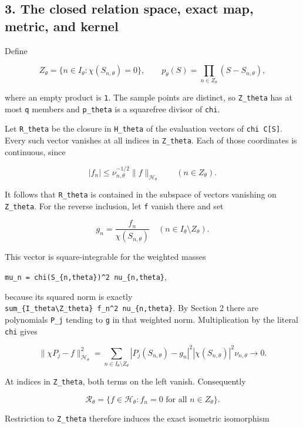\subsection{3. The closed relation space, exact map, metric, and kernel}\label{the-closed-relation-space-exact-map-metric-and-kernel}

Define

\[
Z_\theta=\{n\in I_\theta:\chi(S_{n,\theta})=0\},\qquad
p_\theta(S)=\prod_{n\in Z_\theta}(S-S_{n,\theta}),
\tag{CQ14}
\]

where an empty product is \texttt{1}. The sample points are distinct, so \texttt{Z\_theta} has at most \texttt{q} members and \texttt{p\_theta} is a squarefree divisor of \texttt{chi}.

Let \texttt{R\_theta} be the closure in \texttt{H\_theta} of the evaluation vectors of \texttt{chi\ C{[}S{]}}. Every such vector vanishes at all indices in \texttt{Z\_theta}. Each of those coordinates is continuous, since

\[
|f_n|\le\nu_{n,\theta}^{-1/2}\|f\|_{\mathcal H_\theta}
\qquad(n\in Z_\theta).
\tag{CQ15}
\]

It follows that \texttt{R\_theta} is contained in the subspace of vectors vanishing on \texttt{Z\_theta}. For the reverse inclusion, let \texttt{f} vanish there and set

\[
g_n=\frac{f_n}{\chi(S_{n,\theta})}
\quad(n\in I_\theta\setminus Z_\theta).
\tag{CQ16}
\]

This vector is square-integrable for the weighted masses

\texttt{mu\_n\ =\ \textbar{}chi(S\_\{n,theta\})\textbar{}\^{}2\ nu\_\{n,theta\}},

because its squared norm is exactly \texttt{sum\_\{I\_theta\textbackslash{}Z\_theta\}\ \textbar{}f\_n\textbar{}\^{}2\ nu\_\{n,theta\}}. By Section 2 there are polynomials \texttt{P\_j} tending to \texttt{g} in that weighted norm. Multiplication by the literal \texttt{chi} gives

\[
\|\chi P_j-f\|_{\mathcal H_\theta}^2
=\sum_{n\in I_\theta\setminus Z_\theta}
|P_j(S_{n,\theta})-g_n|^2
|\chi(S_{n,\theta})|^2\nu_{n,\theta}\longrightarrow0.
\tag{CQ17}
\]

At indices in \texttt{Z\_theta}, both terms on the left vanish. Consequently

\[
\mathcal R_\theta
=\{f\in\mathcal H_\theta:f_n=0\text{ for all }n\in Z_\theta\}.
\tag{CQ18}
\]

Restriction to \texttt{Z\_theta} therefore induces the exact isometric isomorphism

